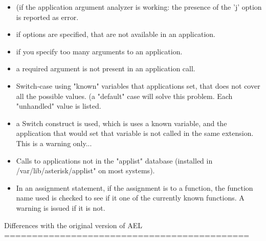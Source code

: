 {\begin{itemize}
    \item (if the application argument analyzer is working: the presence
      of the 'j' option is reported as error.
    \item if options are specified, that are not available in an
      application.
    \item if you specify too many arguments to an application.
    \item a required argument is not present in an application call.
    \item Switch-case using "known" variables that applications set, that
      does not cover all the possible values. (a "default" case will
      solve this problem. Each "unhandled" value is listed.
    \item a Switch construct is used, which is uses a known variable, and
      the application that would set that variable is not called in
      the same extension. This is a warning only...
    \item Calls to applications not in the "applist" database (installed
      in /var/lib/asterisk/applist" on most systems).
    \item In an assignment statement, if the assignment is to a function,
      the function name used is checked to see if it one of the
      currently known functions. A warning is issued if it is not.
\end{itemize}


Differences with the original version of AEL
============================================

}
